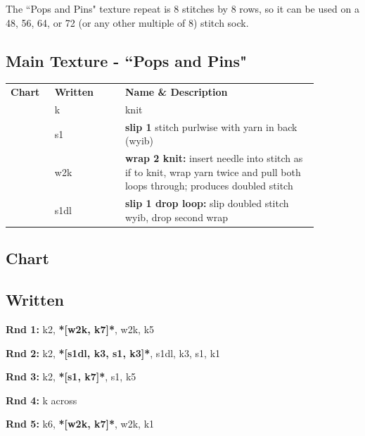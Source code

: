 \documentclass[12pt]{article}
\newcommand{\rowDir}[1]{\textbf{#1:}} %
\renewcommand{\repeat}[1]{\textbf{*[#1]*}} %
\begin{document}
\begin{titlingpage}
\begin{multicols}{2}
\vspace{1em}
The ``Pops and Pins" texture repeat is 8 stitches by 8 rows, so it can be used on a 48, 56, 64, or 72 (or any other multiple of 8) stitch sock. 

\vfill

\subsection*{Main Texture - ``Pops and Pins"}

\small
\begin{tabular}{| C{0.12\linewidth}  C{0.2\linewidth}  p{0.55\linewidth} | }
\thickhline {} 
\textbf{Chart}	& \textbf{Written}	& \textbf{Name \& Description} \\ \thickhline
\chart{-}	& k	&  knit	\\
	& s1		& \textbf{slip 1} stitch purlwise with yarn in back (wyib) \\
	& w2k		& \textbf{wrap 2 knit:} insert needle into stitch as if to knit, wrap yarn twice and pull both loops through; produces doubled stitch \\
	& s1dl		& \textbf{slip 1 drop loop:} slip doubled stitch wyib, drop second wrap \\ \hline
\end{tabular}

\normalsize

\subsection*{Chart}


\small
\subsection*{Written}

\rowDir{Rnd 1} k2, \repeat{w2k, k7}, w2k, k5

\rowDir{Rnd 2} k2, \repeat{s1dl, k3, s1, k3}, s1dl, k3, s1, k1

\rowDir{Rnd 3} k2, \repeat{s1, k7}, s1, k5

\rowDir{Rnd 4} k across

\rowDir{Rnd 5} k6, \repeat{w2k, k7}, w2k, k1


\end{multicols}
\end{titlingpage}
\end{document}
